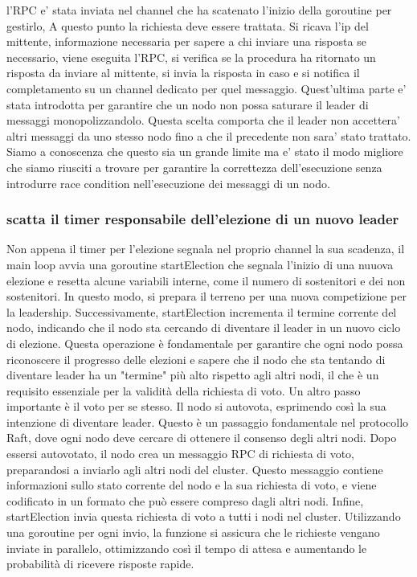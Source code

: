 l'RPC e' stata inviata nel channel che ha scatenato l'inizio della goroutine per gestirlo,
A questo punto la richiesta deve essere trattata.
Si ricava l'ip del mittente, informazione necessaria per sapere a chi inviare una risposta se necessario,
viene eseguita l'RPC, si verifica se la procedura ha ritornato un risposta da inviare al mittente,
si invia la risposta in caso e si notifica il completamento su un channel dedicato 
per quel messaggio. Quest'ultima parte e' stata introdotta per garantire che un nodo non possa 
saturare il leader di messaggi monopolizzandolo. Questa scelta comporta che il leader non accettera' 
altri messaggi da uno stesso nodo fino a che il precedente non sara' stato trattato. Siamo a 
conoscenza che questo sia un grande limite ma e' stato il modo migliore che siamo riusciti 
a trovare per garantire la correttezza dell'esecuzione senza introdurre race condition nell'esecuzione
dei messaggi di un nodo.

\subsubsection{scatta il timer responsabile dell'elezione di un nuovo leader}
Non appena il timer per l'elezione segnala nel proprio channel la sua scadenza, il main loop avvia una goroutine startElection che segnala l'inizio di una nuuova elezione e resetta alcune variabili interne, come il numero di 
sostenitori e dei non sostenitori. In questo modo, si prepara il terreno per una nuova competizione per la leadership.
Successivamente, startElection incrementa il termine corrente del nodo, indicando che il nodo sta cercando di diventare il leader in un nuovo ciclo di elezione. Questa operazione è fondamentale per garantire che ogni nodo 
possa riconoscere il progresso delle elezioni e sapere che il nodo che sta tentando di diventare leader ha un "termine" più alto rispetto agli altri nodi, il che è un requisito essenziale per la validità della richiesta di voto.
Un altro passo importante è il voto per se stesso. Il nodo si autovota, esprimendo così la sua intenzione di diventare leader. Questo è un passaggio fondamentale nel protocollo Raft, dove ogni nodo deve cercare di ottenere il 
consenso degli altri nodi.
Dopo essersi autovotato, il nodo crea un messaggio RPC di richiesta di voto, preparandosi a inviarlo agli altri nodi del cluster. Questo messaggio contiene informazioni sullo stato corrente del nodo e la sua richiesta di voto, e viene codificato in un formato che può essere compreso dagli altri nodi.
Infine, startElection invia questa richiesta di voto a tutti i nodi nel cluster. Utilizzando una goroutine per ogni invio, la funzione si assicura che le richieste vengano inviate in parallelo, ottimizzando così il tempo di 
attesa e aumentando le probabilità di ricevere risposte rapide.

